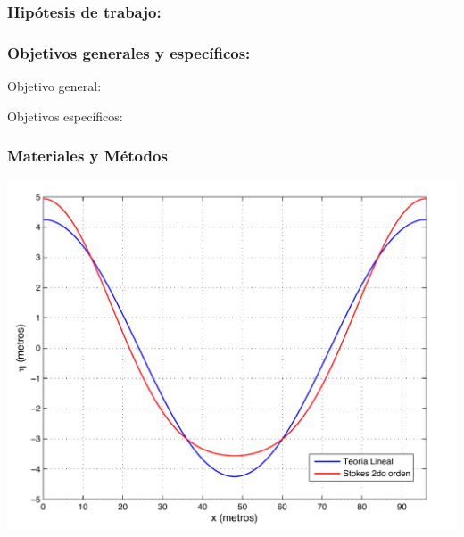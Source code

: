 \documentclass[11pt,letterpaper]{article}
\begin{document}
\begin{tcolorbox}[breakable]
\vspace{0.75cm}
\subsubsection{Hipótesis de trabajo:}

\lipsum[17]

\vspace{0.5cm}
\subsubsection{Objetivos generales y específicos:}

Objetivo general: \\

\lipsum[18]

\vspace{0.5cm}

Objetivos específicos:

\blindenumerate[4]

\subsubsection{Materiales y Métodos} \label{sec:sec3}

\lipsum[19-21]

{\centering
\includegraphics[scale=0.5]{figs/fig_6.pdf}
\vspace{-4.5mm}
}
\vspace{3.5mm} 

\lipsum[22-25]



\end{tcolorbox}
\end{document}
